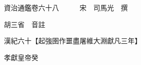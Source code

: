 










 


 
 


 

  
  
  
  
  





  
  
  
  
  
 
  

  

  
  
  



  

 
 

  
   




  

  
  


  　　資治通鑑卷六十八　　　宋　司馬光　撰

　　胡三省　音註

　　漢紀六十【起強圉作噩盡屠維大淵獻凡三年】

　　孝獻皇帝癸

